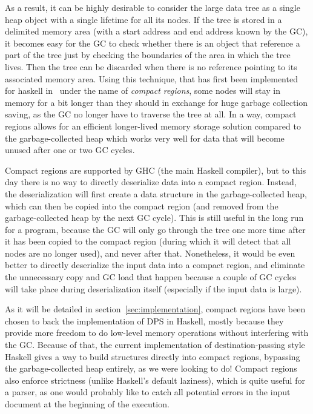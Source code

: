 \documentclass[english]{jflart}
\begin{document}
As a result, it can be highly desirable to consider the large data tree as a single heap object with a single lifetime for all its nodes. If the tree is stored in a delimited memory area (with a start address and end address known by the GC), it becomes easy for the GC to check whether there is an object that reference a part of the tree just by checking the boundaries of the area in which the tree lives. Then the tree can be discarded when there is no reference pointing to its associated memory area. Using this technique, that has first been implemented for haskell in~\cite{yang_efficient_2015} under the name of \emph{compact regions}, some nodes will stay in memory for a bit longer than they should in exchange for huge garbage collection saving, as the GC no longer have to traverse the tree at all. In a way, compact regions allows for an efficient longer-lived memory storage solution compared to the garbage-collected heap which works very well for data that will become unused after one or two GC cycles.

Compact regions are supported by GHC (the main Haskell compiler), but to this day there is no way to directly deserialize data into a compact region. Instead, the deserialization will first create a data structure in the garbage-collected heap, which can then be copied into the compact region (and removed from the garbage-collected heap by the next GC cycle). This is still useful in the long run for a program, because the GC will only go through the tree one more time after it has been copied to the compact region (during which it will detect that all nodes are no longer used), and never after that. Nonetheless, it would be even better to directly deserialize the input data into a compact region, and eliminate the unnecessary copy and GC load that happen because a couple of GC cycles will take place during deserialization itself (especially if the input data is large).

As it will be detailed in section~\ref{sec:implementation}, compact regions have been chosen to back the implementation of DPS in Haskell, mostly because they provide more freedom to do low-level memory operations without interfering with the GC. Because of that, the current implementation of destination-passing style Haskell gives a way to build structures directly into compact regions, bypassing the garbage-collected heap entirely, as we were looking to do! Compact regions also enforce strictness (unlike Haskell's default laziness), which is quite useful for a parser, as one would probably like to catch all potential errors in the input document at the beginning of the execution.
\end{document}
